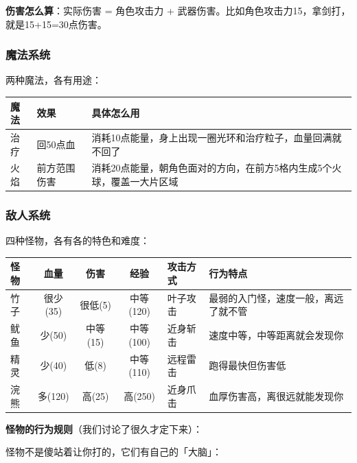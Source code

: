 \documentclass[12pt,a4paper]{article}
\begin{document}
\textbf{伤害怎么算}：实际伤害 = 角色攻击力 + 武器伤害。比如角色攻击力15，拿剑打，就是15+15=30点伤害。

\subsubsection{魔法系统}

两种魔法，各有用途：

\begin{table}[htbp]
\centering
\renewcommand{\arraystretch}{1.4}
\begin{tabularx}{\textwidth}{lXX}
\toprule
\textbf{魔法} & \textbf{效果} & \textbf{具体怎么用} \\
\midrule
治疗 & 回50点血 & 消耗10点能量，身上出现一圈光环和治疗粒子，血量回满就不回了 \\
火焰 & 前方范围伤害 & 消耗20点能量，朝角色面对的方向，在前方5格内生成5个火球，覆盖一大片区域 \\
\bottomrule
\end{tabularx}
\end{table}

\subsubsection{敌人系统}

四种怪物，各有各的特色和难度：

\begin{table}[htbp]
\centering
\renewcommand{\arraystretch}{1.4}
\begin{tabularx}{\textwidth}{lccclX}
\toprule
\textbf{怪物} & \textbf{血量} & \textbf{伤害} & \textbf{经验} & \textbf{攻击方式} & \textbf{行为特点} \\
\midrule
竹子 & 很少(35) & 很低(5) & 中等(120) & 叶子攻击 & 最弱的入门怪，速度一般，离远了就不管 \\
鱿鱼 & 少(50) & 中等(15) & 中等(100) & 近身斩击 & 速度中等，中等距离就会发现你 \\
精灵 & 少(40) & 低(8) & 中等(110) & 远程雷击 & 跑得最快但伤害低 \\
浣熊 & 多(120) & 高(25) & 高(250) & 近身爪击 & 血厚伤害高，离很远就能发现你 \\
\bottomrule
\end{tabularx}
\end{table}

\textbf{怪物的行为规则}（我们讨论了很久才定下来）：

怪物不是傻站着让你打的，它们有自己的「大脑」：
\end{document}
